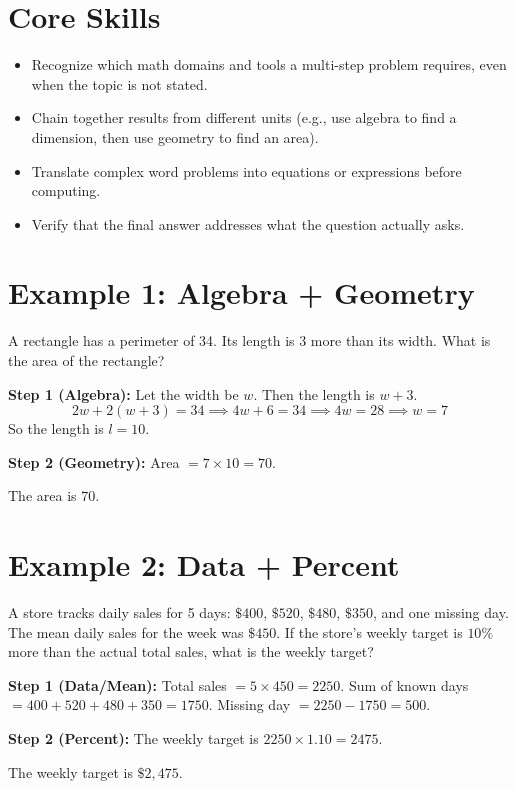 \documentclass[14pt]{extarticle}
\begin{document}
\section*{Core Skills}
\begin{itemize}
  \item Recognize which math domains and tools a multi-step problem requires, even when the topic is not stated.
  \item Chain together results from different units (e.g., use algebra to find a dimension, then use geometry to find an area).
  \item Translate complex word problems into equations or expressions before computing.
  \item Verify that the final answer addresses what the question actually asks.
\end{itemize}

\section*{Example 1: Algebra + Geometry}

A rectangle has a perimeter of 34. Its length is 3 more than its width. What is the area of the rectangle?

\textbf{Step 1 (Algebra):} Let the width be \(w\). Then the length is \(w + 3\).
\[
2w + 2(w + 3) = 34 \implies 4w + 6 = 34 \implies 4w = 28 \implies w = 7
\]
So the length is \(l = 10\).

\textbf{Step 2 (Geometry):} Area \(= 7 \times 10 = 70\).

The area is \(\boxed{70}\).

\section*{Example 2: Data + Percent}

A store tracks daily sales for 5 days: \(\$400\), \(\$520\), \(\$480\), \(\$350\), and one missing day. The mean daily sales for the week was \(\$450\). If the store's weekly target is \(10\%\) more than the actual total sales, what is the weekly target?

\textbf{Step 1 (Data/Mean):} Total sales \(= 5 \times 450 = 2250\). Sum of known days \(= 400 + 520 + 480 + 350 = 1750\). Missing day \(= 2250 - 1750 = 500\).

\textbf{Step 2 (Percent):} The weekly target is \(2250 \times 1.10 = 2475\).

The weekly target is \(\boxed{\$2{,}475}\).
\end{document}
